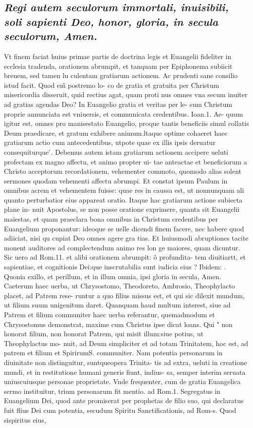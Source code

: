 \documentclass{article}
\begin{document}
\begin{pages}
\subsection*{\textit{Regi autem seculorum immortali, inuisibili, soli sapienti Deo, honor, gloria, in secula seculorum, Amen. }}\pstart Vt finem faciat huius primae partis de doctrina legis et Euangelii fideliter in ecclesia tradenda, orationem abrumpit, et tanquam per Epiphonema subiicit breuem, sed tamen lu culentam gratiarum actionem. Ac prudenti sane consilio istud facit. Quod em̃ postremo lo- co de gratia et gratuita per Christum misericordia disseruit, quid rectius agat, quam proti nus omnes vna secum inuiter ad gratias agendas Deo? In Euangelio gratia et veritas per le- sum Christum proprie annunciata est vniuersis, et communicata credentibus. Ioan.1. Ae- quum igitur est, omnes pro manisestato Euangelio, proque  tantis beneficiis simul collatis Deum praedicare, et gratum exhibere animum.ltaque  optime cohaeret haec gratiarum actio cum antecedentibus, utpote quae ex illis ipsis deruatur consequiturque ́. Debemus autem istam gratiarum actionem accipere ueluti profectam ex magno affectu, et animo propter ui- tae anteactae et beneficiorum a Christo acceptorum recordationem, vehementer commoto, quomodo alias solent sermones quodam vehementi affectu abrumpi. Et constat ipsum Paulum in omnibus acrem et vehementem fuisse: quae res in caussa est, ut nonnunquam ali quanto perturbatior eius appareat oratio. Itaque  hac gratiarum actione subiecta plane in- nuit Apostolus, se non posse oratione exprimere, quanta sit Euangelii maiestas, et quam praeclara bona omnibus in Christum credentibus per Euangelium proponantur: ideoque  se uelle dicendi finem facere, nec habere quod adiiciat, nisi qu cupiat Deo omnes agere gra tias. Et huiusmodi abruptiones tacite monent auditores ad complectendum animo res lon ge maiores, quam dicuntur. Sic uero ad Rom.11. et alibi orationem abrumpit: ô profundita- tem diuitiartt, et sapientiae, et cognitionis Dei:que  inscrutabilia sunt iudicia eius ? Ibidem: .  Quonia exillo, et perillum, et in illum omnia, ipsi gloria in secula, Amen. Caeterum haec uerba, ut Chrysostomo, Theodoreto, Ambrosio, Theophylacto placet, ad Patrem rese- runtur a quo filius missus est, et qui sic dilexit mundum, ut filium suum unigenitum daret. Quanquam haud multum interest, siue ad Patrem et filium communiter haec uerba referantur, quemadmodum et Chrysostomus demonstrat, maxime cum Christus ipse dicat loans. Qui " non honorat filium, non honorat Patrem, qui misit illum:siue potius, ut Theophylactus mo- nuit, ad Deum simpliciter et ad totam Trinitatem, hoc est, ad patrem et filium et SpirirumS. communiter. Nam potentia personarum in diuinitate non distinguitur, suntqueopera Trinita- tis ad extra, ueluti in creatione mundi, et in restitutione humani generis fiunt, indius- sa, semper interim seruata uniuscuiusque  personae proprietate. Vnde frequenter, cum de gratia Euangelica sermo instituitur, trium personarum fit mentio. ad Rom.1. Segregatus in Euangelium Dei, quod ante promiserat per prophetas de filio suo, qui declaratus fuit flius Dei cum potentia, secudum Spiritu Sanctificationis, ad Rom-s. Quod sispiritus eius,  \pend

\end{pages}
\end{document}
